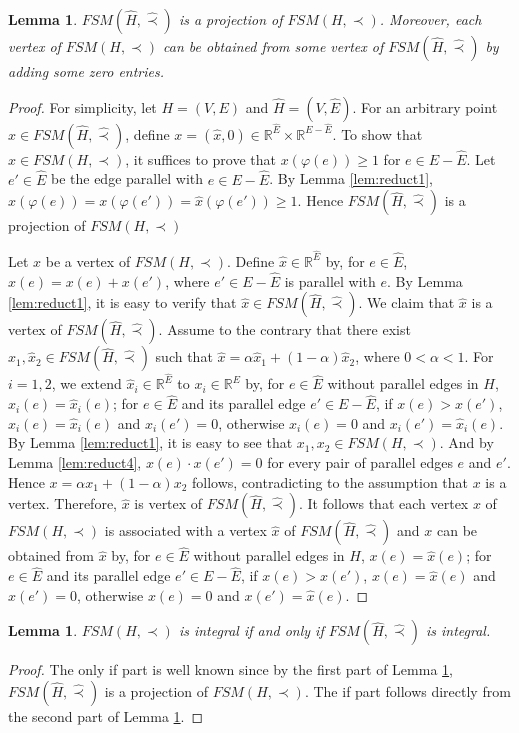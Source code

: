 \documentclass[11pt]{article}
\newtheorem{lemma}[theorem]{Lemma}
\numberwithin{theorem}{section}
\begin{document}
\begin{lemma}
\label{lem:reduct5}
$FSM(\hat{H},\hat\prec)$ is a projection of $FSM(H,\prec)$. Moreover, each vertex of $FSM(H,\prec)$ can be obtained from some vertex of $FSM(\hat{H},\hat\prec)$ by adding some zero entries. 
\end{lemma}
\begin{proof}
For simplicity, let $H=(V,E)$ and $\hat{H}=(V,\hat{E})$.
For an arbitrary point $\hat{x}\in FSM(\hat{H},\hat\prec)$, define $x=(\hat{x},0)\in \mathbb{R}^{\hat{E}}\times \mathbb{R}^{E-\hat{E}}$. To show that $x\in FSM(H,\prec)$, it suffices to prove that $x(\varphi(e))\geq 1$ for $e\in E-\hat{E}$. Let $e'\in \hat{E}$ be the edge parallel with $e\in E-\hat{E}$. By Lemma \ref{lem:reduct1}, $x(\varphi(e))=x(\varphi(e'))=\hat{x}(\varphi(e'))\geq 1$. Hence $FSM(\hat{H},\hat\prec)$ is a projection of $FSM(H,\prec)$

Let $x$ be a vertex of $FSM(H,\prec)$. Define $\hat{x}\in \mathbb{R}^{\hat{E}}$ by, for $e\in \hat{E}$, $\hat{x}(e)=x(e)+x(e')$, where $e'\in E-\hat{E}$ is parallel with $e$. By Lemma \ref{lem:reduct1}, it is easy to verify that $\hat{x}\in FSM(\hat{H},\hat\prec)$. We claim that $\hat{x}$ is a vertex of $FSM(\hat{H},\hat\prec)$. Assume to the contrary that there exist $\hat{x}_1, \hat{x}_2 \in FSM(\hat{H},\hat\prec)$ such that $\hat{x}=\alpha \hat{x}_1+ (1-\alpha)\hat{x}_2$, where $0<\alpha<1$. For $i=1,2$, we extend $\hat{x}_i\in \mathbb{R}^{\hat{E}}$ to $x_i\in \mathbb{R}^{E}$ by, for $e\in \hat{E}$ without parallel edges in $H$, $x_i(e)=\hat{x}_i(e)$; for $e\in\hat{E}$ and its parallel edge $e'\in E-\hat{E}$, if $x(e)>x(e')$, $x_i(e)=\hat{x}_i(e)$ and $x_i(e')=0$, otherwise $x_i(e)=0$ and $x_i(e')=\hat{x}_i(e)$. By Lemma \ref{lem:reduct1}, it is easy to see that $x_1,x_2\in FSM(H,\prec)$. And by Lemma \ref{lem:reduct4}, $x(e)\cdot x(e')=0$ for every pair of parallel edges $e$ and $e'$. Hence $x=\alpha x_1+(1-\alpha) x_2$ follows, contradicting to the assumption that $x$ is a vertex. Therefore, $\hat{x}$ is vertex of $FSM(\hat{H},\hat\prec)$. It follows that each vertex $x$ of $FSM(H,\prec)$ is associated with a vertex $\hat{x}$ of $FSM(\hat{H},\hat\prec)$ and $x$ can be obtained from $\hat{x}$ by, for $e\in \hat{E}$ without parallel edges in $H$, $x(e)=\hat{x}(e)$; for $e\in\hat{E}$ and its parallel edge $e'\in E-\hat{E}$, if $x(e)>x(e')$, $x(e)=\hat{x}(e)$ and $x(e')=0$, otherwise $x(e)=0$ and $x(e')=\hat{x}(e)$. 
\end{proof}

\begin{lemma}
\label{lem:reduct6}
$FSM(H,\prec)$ is integral if and only if $FSM(\hat{H},\hat\prec)$ is integral.
\end{lemma}
\begin{proof}
The only if part is well known since by the first part of Lemma \ref{lem:reduct5}, $FSM(\hat{H},\hat\prec)$ is a projection of $FSM(H,\prec)$. The if part follows directly from the second part of Lemma \ref{lem:reduct5}.
\end{proof}
\end{document}
